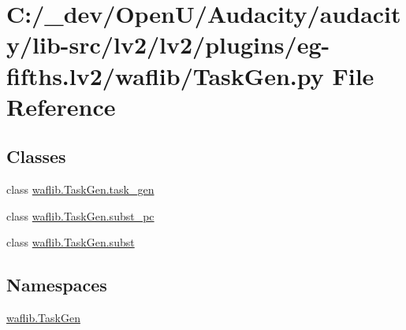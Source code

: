 \hypertarget{lv2_2plugins_2eg-fifths_8lv2_2waflib_2_task_gen_8py}{}\section{C\+:/\+\_\+dev/\+Open\+U/\+Audacity/audacity/lib-\/src/lv2/lv2/plugins/eg-\/fifths.lv2/waflib/\+Task\+Gen.py File Reference}
\label{lv2_2plugins_2eg-fifths_8lv2_2waflib_2_task_gen_8py}
\subsection*{Classes}
\begin{DoxyCompactItemize}
\item 
class \hyperlink{classwaflib_1_1_task_gen_1_1task__gen}{waflib.\+Task\+Gen.\+task\+\_\+gen}
\item 
class \hyperlink{classwaflib_1_1_task_gen_1_1subst__pc}{waflib.\+Task\+Gen.\+subst\+\_\+pc}
\item 
class \hyperlink{classwaflib_1_1_task_gen_1_1subst}{waflib.\+Task\+Gen.\+subst}
\end{DoxyCompactItemize}
\subsection*{Namespaces}
\begin{DoxyCompactItemize}
\item 
 \hyperlink{namespacewaflib_1_1_task_gen}{waflib.\+Task\+Gen}
\end{DoxyCompactItemize}
